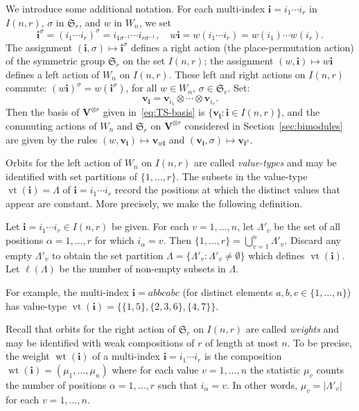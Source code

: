\documentclass[ALCO,ThmDefs,Unicode,epreuves]{cedram}
\DeclareMathOperator{\vt}{vt}
\DeclareMathOperator{\wt}{wt}
\newcommand{\Sym}{\mathfrak{S}}
\newcommand{\bi}{{\boldsymbol{i}}} %
\newcommand{\V}{\mathbf{V}} %
\newcommand{\bv}{\mathbf{v}} %
\begin{document}
We introduce some additional notation. For each multi-index $\bi =
i_1\cdots i_r$ in $I(n,r)$, $\sigma$ in $\Sym_r$, and $w$ in $W_n$, we
set
\[
 \bi^\sigma = (i_1\cdots i_r)^\sigma = i_{1 \sigma^{-1}} \cdots
 i_{r \sigma^{-1}}, \quad w \bi = w(i_1 \cdots i_r) = w(i_1) \cdots w(i_r).
\] 
The assignment $(\bi , \sigma) \mapsto \bi^\sigma$ defines a right
action (the place-permutation action) of the symmetric group $\Sym_r$
on the set $I(n,r)$; the assignment $(w,\bi) \mapsto w \bi$ defines a
left action of $W_n$ on $I(n,r)$. These left and right actions on
$I(n,r)$ commute: $(w\bi)^\sigma = w(\bi^\sigma)$, for all $w \in
W_n$, $\sigma \in \Sym_r$. Set:
\begin{equation}
 \bv_\bi = \bv_{i_1} \otimes \cdots \otimes \bv_{i_r}.
\end{equation}
Then the basis of $\V^{\otimes r}$ given in~\eqref{eq:TS-basis} is
$\{\bv_\bi: \bi \in I(n,r)\}$, and the commuting actions of $W_n$ and
$\Sym_r$ on $\V^{\otimes r}$ considered in Section~\ref{sec:bimodules}
are given by the rules $(w, \bv_\bi) \mapsto \bv_{w\bi}$ and
$(\bv_\bi, \sigma) \mapsto \bv_{\bi^\sigma}$.

Orbits for the left action of $W_n$ on $I(n,r)$ are called
\emph{value-types} and may be identified with set partitions of $\{1,
\dots, r\}$. The subsets in the value-type $\vt(\bi) = \Lambda$ of
$\bi = i_1 \cdots i_r$ record the positions at which the distinct
values that appear are constant. More precisely, we make the following
definition.

\begin{defi}\label{def:value-type}
 Let $\bi = i_1 \cdots i_r \in I(n,r)$ be given. For each $v =
 1, \dots, n$, let $\Lambda'_v$ be the set of all positions
 $\alpha = 1, \dots, r$ for which $i_\alpha = v$. Then $\{1, \dots,
 r\} = \bigcup_{v=1}^n \Lambda'_v$. Discard any empty $\Lambda'_v$ to
 obtain the set partition $\Lambda = \{ \Lambda'_v : \Lambda'_v \ne
 \emptyset\}$ which defines $\vt(\bi)$. Let $\ell(\Lambda)$ be the
 number of non-empty subsets in $\Lambda$.
\end{defi}

For example, the multi-index $\bi = abbcabc$ (for distinct elements
$a,b,c \in \{1, \dots, n\}$) has value-type $\vt(\bi) = \{\{1,5\},
\{2,3,6\}, \{4,7\}\}$.

Recall that orbits for the right action of $\Sym_r$ on $I(n,r)$ are
called \emph{weights} and may be identified with weak compositions of
$r$ of length at most $n$. To be precise, the weight $\wt(\bi)$ of a
multi-index $\bi = i_1 \cdots i_r$ is the composition $\wt(\bi) =
(\mu_1, \dots, \mu_n)$ where for each value $v = 1, \dots, n$ the
statistic $\mu_v$ counts the number of positions $\alpha = 1, \dots,
r$ such that $i_\alpha = v$. In other words, $\mu_v = |\Lambda'_v|$
for each $v = 1, \dots, n$.
\end{document}
